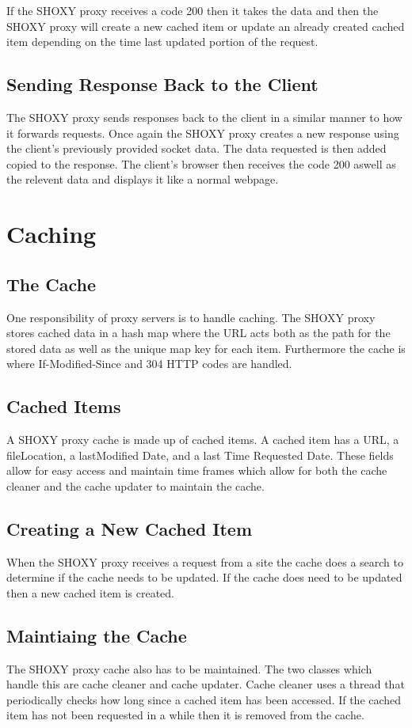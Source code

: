\documentclass[11pt]{article}
\begin{document}
If the SHOXY proxy receives a code 200 then it takes the data and  then the SHOXY proxy will create a new cached item or update an already created cached item depending on the time last updated portion of the request. 

\subsection{Sending Response Back to the Client}
The SHOXY proxy sends responses back to the client in a similar manner to how it forwards requests. Once again the SHOXY proxy creates a new response using the client's previously provided socket data. The data requested is then added copied to the response. The client's browser then receives the code 200 aswell as the relevent data and displays it like a normal webpage.  


\section{Caching}
\subsection{The Cache}
One responsibility of proxy servers is to handle caching. The SHOXY proxy stores cached data in a hash map where the URL acts both as the path for the stored data as well as the unique map key for each item. Furthermore the cache is where If-Modified-Since and 304 HTTP codes are handled. 

\subsection{Cached Items}
A SHOXY proxy cache is made up of cached items. A cached item has a URL, a fileLocation, a lastModified Date, and a last Time Requested Date. These fields allow for easy access and maintain time frames which allow for both the cache cleaner and the cache updater to maintain the cache. 


\subsection{Creating a New Cached Item}
When the SHOXY proxy receives a request from a site the cache does a search to determine if the cache needs to be updated. If the cache does need to be updated then a new cached item is created. 

\subsection{Maintiaing the Cache}
The SHOXY proxy cache also has to be maintained. The two classes which handle this are cache cleaner and cache updater. Cache cleaner uses a thread that periodically checks how long since a cached item has been accessed. If the cached item has not been requested in  a while then it is removed from the cache. 
\end{document}
